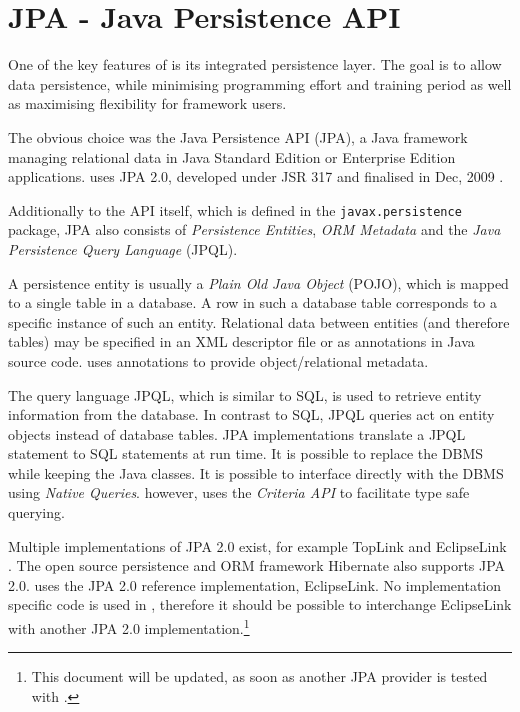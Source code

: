 \section{JPA - Java Persistence API}
One of the key features of \salespoint{} is its integrated persistence layer. The goal is to allow data persistence, while minimising programming effort and training period as well as maximising flexibility for framework users.

The obvious choice was the Java Persistence API (JPA), a Java framework managing relational data in Java Standard Edition or Enterprise Edition applications. \salespoint{} uses JPA 2.0, developed under JSR 317 and finalised in Dec, 2009 \cite{jpa}.

Additionally to the API itself, which is defined in the \texttt{javax.persistence} package, JPA also consists of \textit{Persistence Entities}, \textit{ORM Metadata} and the \textit{Java Persistence Query Language} (JPQL).

A persistence entity is usually a \textit{Plain Old Java Object} (POJO), which is mapped to a single table in a database.
A row in such a database table corresponds to a specific instance of such an entity.
Relational data between entities (and therefore tables) may be specified in an XML descriptor file or as annotations in Java source code.
\salespoint{} uses annotations to provide object/relational metadata.

The query language JPQL, which is similar to SQL, is used to retrieve entity information from the database.
In contrast to SQL, JPQL queries act on entity objects instead of database tables.
JPA implementations translate a JPQL statement to SQL statements at run time.
It is possible to replace the DBMS while keeping the Java classes.
It is possible to interface directly with the DBMS using \textit{Native Queries}.
\salespoint{} however, uses the \textit{Criteria API} \cite{jpa, eclipselink-javadoc} to facilitate type safe querying.

Multiple implementations of JPA 2.0 exist, for example TopLink \cite{toplink} and EclipseLink \cite{eclipselink}.
The open source persistence and ORM framework Hibernate \cite{hibernate} also supports JPA 2.0.
\salespoint{} uses the JPA 2.0 reference implementation, EclipseLink.
No implementation specific code is used in \salespoint{}, therefore it should be possible to interchange EclipseLink with another JPA 2.0 implementation.\footnote{This document will be updated, as soon as another JPA provider is tested with \salespoint{}.}
